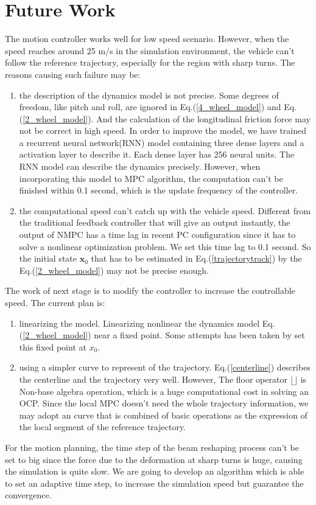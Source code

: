 \documentclass[conference, onecolumn]{IEEEtran}
\begin{document}
\section{Future Work}
The motion controller works well for low speed scenario. However, when the speed reaches around 25 m/s in the simulation environment, the vehicle can't follow the reference trajectory, especially for the region with sharp turns. The reasons causing such failure may be:
\begin{enumerate}
	\item the description of the dynamics model is not precise. Some degrees of freedom, like pitch and roll, are ignored in Eq.(\ref{4_wheel_model}) and Eq.(\ref{2_wheel_model}). And the calculation of the longitudinal friction force may not be correct in high speed. In order to improve the model, we have trained a recurrent neural network(RNN) model containing three dense layers and a activation layer to describe it. Each dense layer has 256 neural units. The RNN model can describe the dynamics precisely. However, when incorporating this model to MPC algorithm, the computation can't be finished within 0.1 second, which is the update frequency of the controller. 
	\item the computational speed can't catch up with the vehicle speed. Different from the traditional feedback controller that will give an output instantly, the output of NMPC has a time lag in recent PC configuration since it has to solve a nonlinear optimization problem. We set this time lag to 0.1 second. So the initial state $\boldsymbol{x}_0$ that has to be estimated in Eq.(\ref{trajectorytrack}) by the Eq.(\ref{2_wheel_model}) may not be precise enough.
\end{enumerate}
 
The work of next stage is to modify the controller to increase the controllable speed. The current plan is:
\begin{enumerate}
	\item linearizing the model. Linearizing nonlinear the dynamics model Eq.(\ref{2_wheel_model}) near a fixed point. Some attempts has been taken by set this fixed point at $x_0$.
	\item using a simpler curve to represent of the trajectory.  Eq.(\ref{centerline}) describes the centerline and the trajectory very well. However, The floor operator $\lfloor\rfloor$ is  Non-base algebra operation, which is a huge computational cost in solving an OCP. Since the local MPC doesn't need the whole trajectory information, we may adopt an curve that is combined of basic operations as the expression of the local segment of the reference trajectory. 
\end{enumerate}

For the motion planning, the time step of the beam reshaping process can't be set to big since the force due to the deformation at sharp turns is huge, causing the simulation is quite slow. We are going to develop an algorithm which is able to set an adaptive time step, to increase the simulation speed but guarantee the convergence.



\end{document}
